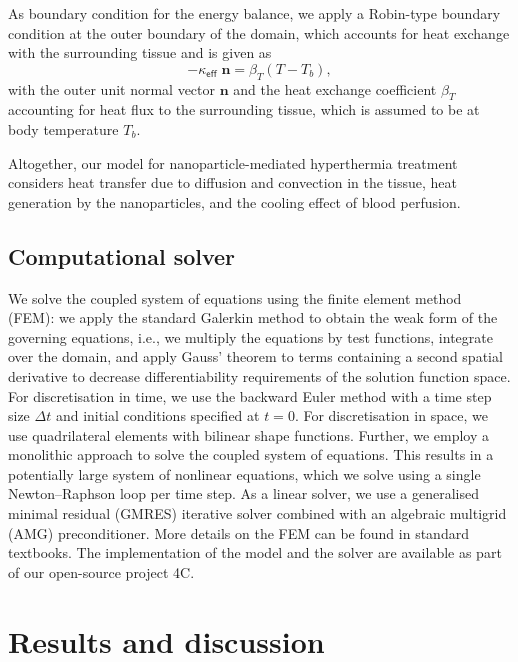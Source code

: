 \documentclass[Times1COL,AMA]{WileyNJDv5} %
\newcommand{\vct}[1]{\boldsymbol{#1}}
\begin{document}
As boundary condition for the energy balance, we apply a Robin-type boundary condition at the outer boundary of the domain, which accounts for heat exchange with the surrounding tissue and is given as \cite{Nabil2015, Nabil2016}
\begin{equation}
    \label{Eq:RobinBoundaryCondition}
    -\kappa_{\textsf{eff}} \; \vct{n}
    =
    \beta_T \left( T - T_{b} \right),
\end{equation}
with the outer unit normal vector $\vct{n}$ and the heat exchange coefficient $\beta_T$ accounting for heat flux to the surrounding tissue, which is assumed to be at body temperature $T_{b}$.

Altogether, our model for nanoparticle-mediated hyperthermia treatment considers heat transfer due to diffusion and convection in the tissue, heat generation by the nanoparticles, and the cooling effect of blood perfusion.

\subsection{Computational solver}

We solve the coupled system of equations using the finite element method (FEM):
we apply the standard Galerkin method to obtain the weak form of the governing equations, i.e., we multiply the equations by test functions, integrate over the domain, and apply Gauss' theorem to terms containing a second spatial derivative to decrease differentiability requirements of the solution function space.
For discretisation in time, we use the backward Euler method with a time step size $\Delta t$ and initial conditions specified at $t = 0$.
For discretisation in space, we use quadrilateral elements with bilinear shape functions.
Further, we employ a monolithic approach to solve the coupled system of equations. \cite{Kremheller2018}
This results in a potentially large system of nonlinear equations, which we solve using a single Newton--Raphson loop per time step.
As a linear solver, we use a generalised minimal residual (GMRES) iterative solver combined with an algebraic multigrid (AMG) preconditioner. \cite{Verdugo2016,Fang2019}
More details on the FEM can be found in standard textbooks. \cite{Wriggers2008a,Zienkiewicz2013}
The implementation of the model and the solver are available as part of our open-source project 4C. \cite{4C2025}

\section{Results and discussion}\label{sec3}
\end{document}
